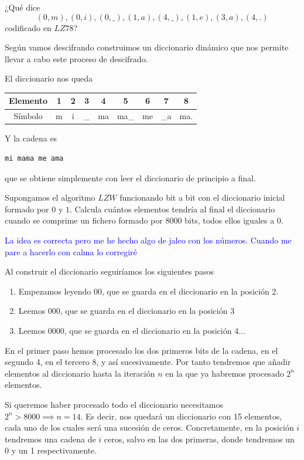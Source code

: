 \begin{problem}[15]
¿Qué dice
\[(0,m),(0,i),(0,\_),(1,a),(4,\_),(1,e),(3,a),(4,.)\]
codificado en $LZ78$?
\solution

Según vamos descifrando construimos un diccionario dinámico que nos permite llevar a cabo este proceso de descifrado.

El diccionario nos queda

\begin{center}
\begin{tabular}{ | c | c | c | c | c | c | c | c | c |}
   \hline
   Elemento & 1 & 2 & 3 & 4 & 5 & 6 & 7 & 8 \\
   \hline
   Símbolo & m & i & \_ & ma & ma\_ & me & \_a & ma.\\
   \hline
 \end{tabular}
\end{center}

Y la cadena es
\begin{verbatim}
mi mama me ama
\end{verbatim}
que se obtiene simplemente con leer el diccionario de principio a final.
\end{problem}

\begin{problem}[16]
Supongamos el algoritmo $LZW$ funcionando bit a bit con el diccionario inicial formado por $0$ y $1$. Calcula cuántos elementos tendría al final el diccionario cuando se comprime un fichero formado por 8000 bits, todos ellos iguales a 0.
\solution

\yoP

\textcolor{blue}{La idea es correcta pero me he hecho algo de jaleo con los números. Cuando me pare a hacerlo con calma lo corregiré}

Al construir el diccionario seguiríamos los siguientes pasos
\begin{enumerate}
\item Empezamos leyendo 00, que se guarda en el diccionario en la posición 2.
\item Leemos 000, que se guarda en el diccionario en la posición 3
\item Leemos 0000, que se guarda en el diccionario en la posición 4...
\end{enumerate}

En el primer paso hemos procesado los dos primeros bits de la cadena, en el segundo 4, en el tercero 8, y así sucesivamente. Por tanto tendremos que añadir elementos al diccionario hasta la iteración $n$ en la que ya habremos procesado $2^n$ elementos.

Si queremos haber procesado todo el diccionario necesitamos $2^n>8000 \implies n =14$. Es decir, nos quedará un diccionario con 15 elementos, cada uno de los cuales será una sucesión de ceros. Concretamente, en la posición $i$ tendremos una cadena de $i$ ceros, salvo en las dos primeras, donde tendremos un 0 y un 1 respectivamente.
\end{problem}

